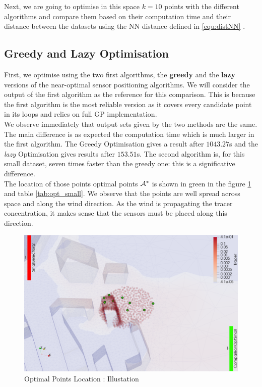 Next, we are going to optimise in this space $k=10$ points with the different algorithms and compare them based on their computation time and their distance between the datasets using the NN distance defined in \ref{equ:distNN} . 

\subsection{Greedy and Lazy Optimisation}

First, we optimise using the two first algorithms, the \textbf{greedy} and the \textbf{lazy} versions of the near-optimal sensor positioning algorithms. We will consider the output of the first algorithm as the reference for this comparison. This is because the first algorithm is the most reliable version as it covers every candidate point in its loops and relies on full GP implementation.  \\


We observe immediately that output sets given by the two methods are the same. The main difference is as expected the computation time which is much larger in the first algorithm. The Greedy Optimisation gives a result after $1043.27$s and the \textit{lazy} Optimisation gives results after $153.51 $s. The second algorithm is, for this small dataset, seven times faster than the greedy one: this is a significative difference. \\ 

The location of those points optimal points $\mathcal{A}^*$ is shown in green in the figure \ref{fig:opt_small} and table \ref{tab:opt_small}. We observe that the points are well spread across space and along the wind direction. As the wind is propagating the tracer concentration, it makes sense that the sensors must be placed along this direction. \\

\begin{figure}[h!]
\centering
    \includegraphics[width=0.8\linewidth]{figures/CompAlg/3rd/non_centered_60.35.0/optimal_screenshot}
    \caption{Optimal Points Location : Illustation}
    \label{fig:opt_small}
\end{figure}

